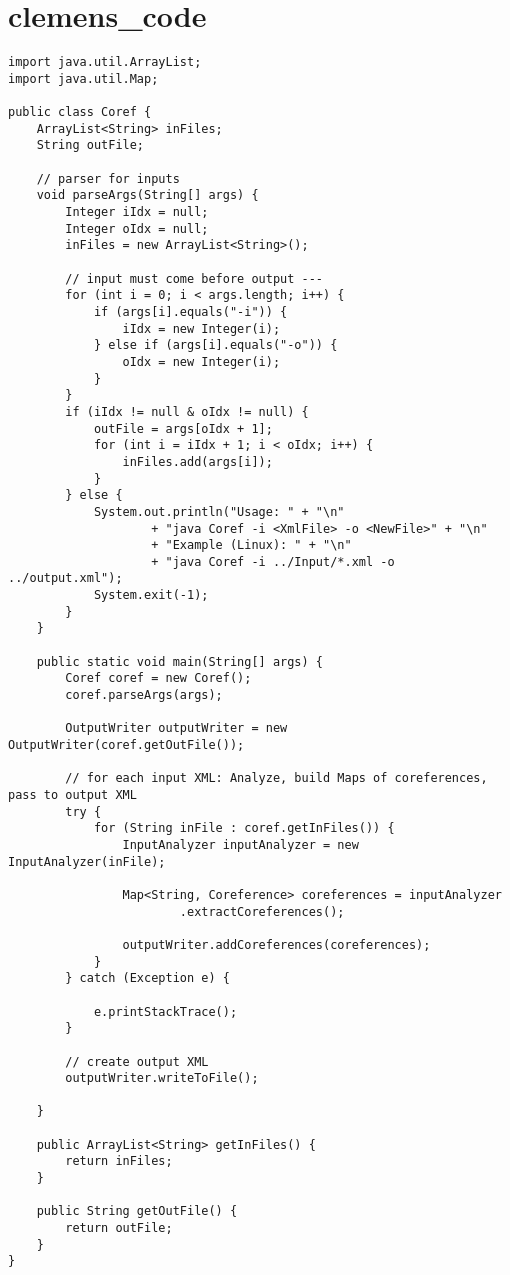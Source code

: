 \section{clemens\_code}\label{clemens_code}

\begin{lstlisting}[caption=Main-Klasse der BuildIndex,label=code:Coref, name=Coref.java] 
import java.util.ArrayList;
import java.util.Map;

public class Coref {
	ArrayList<String> inFiles;
	String outFile;

	// parser for inputs
	void parseArgs(String[] args) {
		Integer iIdx = null;
		Integer oIdx = null;
		inFiles = new ArrayList<String>();

		// input must come before output ---
		for (int i = 0; i < args.length; i++) {
			if (args[i].equals("-i")) {
				iIdx = new Integer(i);
			} else if (args[i].equals("-o")) {
				oIdx = new Integer(i);
			}
		}
		if (iIdx != null & oIdx != null) {
			outFile = args[oIdx + 1];
			for (int i = iIdx + 1; i < oIdx; i++) {
				inFiles.add(args[i]);
			}
		} else {
			System.out.println("Usage: " + "\n"
					+ "java Coref -i <XmlFile> -o <NewFile>" + "\n"
					+ "Example (Linux): " + "\n"
					+ "java Coref -i ../Input/*.xml -o ../output.xml");
			System.exit(-1);
		}
	}

	public static void main(String[] args) {
		Coref coref = new Coref();
		coref.parseArgs(args);

		OutputWriter outputWriter = new OutputWriter(coref.getOutFile());

		// for each input XML: Analyze, build Maps of coreferences, pass to output XML
		try {
			for (String inFile : coref.getInFiles()) {
				InputAnalyzer inputAnalyzer = new InputAnalyzer(inFile);

				Map<String, Coreference> coreferences = inputAnalyzer
						.extractCoreferences();

				outputWriter.addCoreferences(coreferences);
			}
		} catch (Exception e) {

			e.printStackTrace();
		}

		// create output XML
		outputWriter.writeToFile();

	}

	public ArrayList<String> getInFiles() {
		return inFiles;
	}

	public String getOutFile() {
		return outFile;
	}
}
\end{lstlisting} 

